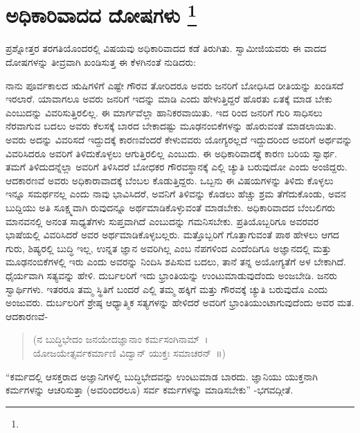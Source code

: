 
\chapter[ಅಧಿಕಾರಿವಾದದ ದೋಷಗಳು ]{ಅಧಿಕಾರಿವಾದದ ದೋಷಗಳು \protect\footnote{}}

ಪ್ರಶ್ನೋತ್ತರ ತರಗತಿಯೊಂದರಲ್ಲಿ ವಿಷಯವು ಅಧಿಕಾರಿವಾದದ ಕಡೆ ತಿರುಗಿತು. ಸ್ವಾಮೀಜಿಯವರು ಈ ವಾದದ ದೋಷಗಳನ್ನು ತೀವ್ರವಾಗಿ ಖಂಡಿಸುತ್ತ ಈ ಕೆಳಗಿನಂತೆ ನುಡಿದರು:

ನಾನು ಪೂರ್ವಕಾಲದ ಋಷಿಗಳಿಗೆ ಎಷ್ಟೇ ಗೌರವ ತೋರಿದರೂ ಅವರು ಜನರಿಗೆ ಬೋಧಿಸಿದ ರೀತಿಯನ್ನು ಖಂಡಿಸದೆ ಇರಲಾರೆ. ಯಾವಾಗಲೂ ಅವರು ಜನರಿಗೆ ಇದನ್ನು ಮಾಡಿ ಎಂದು ಹೇಳುತ್ತಿದ್ದರೆ ಹೊರತು ಏತಕ್ಕೆ ಮಾಡ ಬೇಕು ಎಂಬುದನ್ನು ವಿವರಿಸುತ್ತಿರಲಿಲ್ಲ. ಈ ಮಾರ್ಗವೆಲ್ಲಾ ಹಾನಿಕರವಾಯಿತು. ಇದ ರಿಂದ ಜನರಿಗೆ ಗುರಿ ಸಾಧಿಸಲು ನೆರವಾಗುವ ಬದಲು ಅವರು ಕೆಲಸಕ್ಕೆ ಬಾರದ ಬೇಕಾದಷ್ಟು ಮೂಢನಂಬಿಕೆಗಳನ್ನು ಹೊರುವಂತೆ ಮಾಡಲಾಯಿತು. ಅವರು ಅದನ್ನು ವಿವರಿಸದೆ ಇದ್ದುದಕ್ಕೆ ಕಾರಣವೆಂದರೆ ಕೇಳುವವರು ಯೋಗ್ಯರಲ್ಲದೆ ಇದ್ದುದರಿಂದ ಅವರಿಗೆ ಅರ್ಥವನ್ನು ವಿವರಿಸಿದರೂ ಅವರಿಗೆ ತಿಳಿದುಕೊಳ್ಳಲು ಆಗುತ್ತಿರಲಿಲ್ಲ ಎಂಬುದು. ಈ ಅಧಿಕಾರಿವಾದಕ್ಕೆ ಕಾರಣ ಬರಿಯ ಸ್ವಾರ್ಥ. ತಮಗೆ ತಿಳಿದುದನ್ನೆಲ್ಲಾ ಅವರಿಗೆ ತಿಳಿಸಿದರೆ ಬೋಧಕರ ಗೌರವಸ್ಥಾನಕ್ಕೆ ಎಲ್ಲಿ ಚ್ಯುತಿ ಬರುವುದೋ ಎಂದು ಅಂಜಿದ್ದರು. ಆದಕಾರಣವೆ ಅವರು ಅಧಿಕಾರಾವಾದಕ್ಕೆ ಬೆಂಬಲ ಕೊಡುತ್ತಿದ್ದರು. ಒಬ್ಬನು ಈ ವಿಷಯಗಳನ್ನು ತಿಳಿದು ಕೊಳ್ಳಲು ಇನ್ನೂ ಸಮರ್ಥನಲ್ಲ ಎಂದು ನಾವು ಭಾವಿಸಿದರೆ, ಅವನಿಗೆ ತಿಳಿವನ್ನು ಕೊಡಲು ಹೆಚ್ಚು ಶ್ರಮ ತೆಗೆದುಕೊಂಡು, ಅವನ ಬುದ್ದಿಯು ಅತಿ ಸೂಕ್ಷ್ಮವಾಗಿ ರುವುದನ್ನೂ ಅರ್ಥಮಾಡಿಕೊಳ್ಳುವಂತೆ ಮಾಡಬೇಕು. ಅಧಿಕಾರಿವಾದದ ಬೆಂಬಲಿಗರು ಮಾನವನಲ್ಲಿ ಅನಂತ ಸಾಧ್ಯತೆಗಳು ಸುಪ್ತವಾಗಿದೆ ಎಂಬುದನ್ನು ಗಮನಿಸಬೇಕು. ಪ್ರತಿಯೊಬ್ಬರಿಗೂ ಅವರವರ ಭಾಷೆಯಲ್ಲಿ ವಿವರಿಸಿದರೆ ಅವರ ಅರ್ಥಮಾಡಿಕೊಳ್ಳಬಲ್ಲರು. ಮತ್ತೊಬ್ಬರಿಗೆ ಗೊತ್ತಾಗುವಂತೆ ಪಾಠ ಹೇಳಲು ಆಗದ ಗುರು, ಶಿಷ್ಯರಲ್ಲಿ ಬುದ್ಧಿ ಇಲ್ಲ, ಉನ್ನತ ಜ್ಞಾನ ಅವರಿಗಿಲ್ಲ ಎಂಬ ನೆಪಗಳಿಂದ ಎಂದೆಂದಿಗೂ ಅಜ್ಞಾನದಲ್ಲಿ ಮತ್ತು ಮೂಢನಂಬಿಕೆಗಳಲ್ಲಿ ಇರು ಎಂದು ಅವರನ್ನು ನಿಂದಿಸಿ ಶಪಿಸುವ ಬದಲು, ತಾನೆ ತನ್ನ ಅಯೋಗ್ಯತೆಗೆ ಅಳ ಬೇಕಾಗಿದೆ. ಧೈರ್ಯವಾಗಿ ಸತ್ಯವನ್ನು ಹೇಳಿ. ದುರ್ಬಲರಿಗೆ ಇದು ಭ್ರಾಂತಿಯನ್ನು ಉಂಟುಮಾಡುವುದೆಂದು ಅಂಜಬೇಡಿ. ಜನರು ಸ್ವಾರ್ಥಿಗಳು. ಇತರರೂ ತಮ್ಮ ಸ್ಥಿತಿಗೆ ಬಂದರೆ ಎಲ್ಲಿ ತಮ್ಮ ಹಕ್ಕಿಗೆ ಮತ್ತು ಗೌರವಕ್ಕೆ ಚ್ಯುತಿ ಬರುವುದೊ ಎಂದು ಅಂಜುವರು. ದುರ್ಬಲರಿಗೆ ಶ್ರೇಷ್ಠ ಆಧ್ಯಾತ್ಮಿಕ ಸತ್ಯಗಳನ್ನು ಹೇಳಿದರೆ ಅವರಿಗೆ ಭ್ರಾಂತಿಯುಂಟಾಗುವುದೆಂದು ಅವರ ಮತ. ಆದಕಾರಣವೆ-

\begin{verse}
(ನ ಬುದ್ಧಿಭೇದಂ ಜನಯೇದಜ್ಞಾನಾಂ ಕರ್ಮಸಂಗಿನಾಮ್​~।\\ಯೋಜಯೇತ್ಸರ್ವಕರ್ಮಾಣಿ ವಿದ್ವಾನ್​ ಯುಕ್ತಃ ಸಮಾಚರನ್​~॥)
\end{verse}

“ಕರ್ಮದಲ್ಲಿ ಆಸಕ್ತರಾದ ಅಜ್ಞಾನಿಗಳಲ್ಲಿ ಬುದ್ಧಿಭೇದವನ್ನು ಉಂಟುಮಾಡ ಬಾರದು. ಜ್ಞಾನಿಯು ಯುಕ್ತನಾಗಿ ಕರ್ಮಗಳನ್ನು ಆಚರಿಸುತ್ತಾ (ಅವರಿಂದರಲೂ) ಸರ್ವ ಕರ್ಮಗಳನ್ನು ಮಾಡಿಸಬೇಕು” -ಭಗವದ್ಗೀತೆ.

